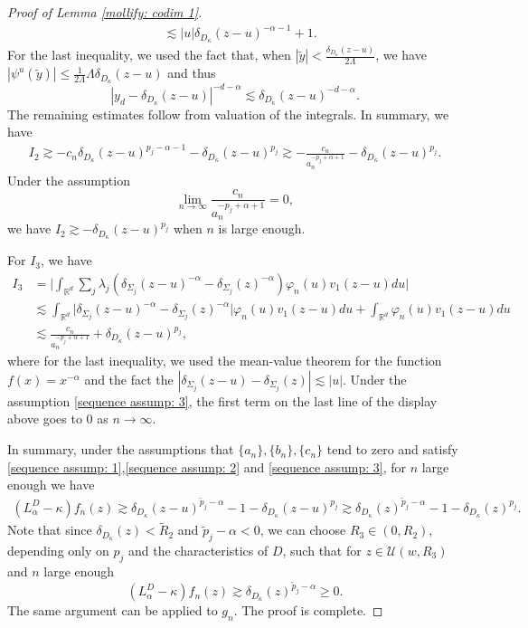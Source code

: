 \documentclass[12pt,a4paper]{amsart}
\numberwithin{equation}{section}
\theoremstyle{plain}
\newcommand{\Si}{\Sigma}
\newcommand{\mc}{\mathcal}
\newcommand{\mb}{\mathbb}
\newcommand{\wt}{\widetilde}
\newcommand{\1}{\mathbbm{1}}
\begin{document}
\begin{proof}[Proof of Lemma \ref{mollify: codim 1}]
\begin{align*}
& \lesssim |u|\delta_{D_{\kappa}}(z-u)^{-\alpha - 1} + 1.
\end{align*}
For the last inequality, we used the fact that, when $|\wt y|< \frac{\delta_{D_{\kappa}}(z-u)}{2\Lambda}$,  we have $|\psi^u(\wt y)| \le \frac{1}{2\Lambda} \Lambda \delta_{D_{\kappa}}(z-u)$ and thus
$$|y_d - \delta_{D_{\kappa}}(z-u)|^{-d-\alpha} \lesssim \delta_{D_{\kappa}}(z-u)^{-d-\alpha}.$$
The remaining estimates follow from valuation of the integrals. In summary, we have
\begin{align}\label{e:I2}
I_2 \gtrsim -c_n \delta_{D_{\kappa}}(z-u)^{p_j-\alpha - 1} - \delta_{D_{\kappa}}(z-u)^{p_j} \gtrsim -\frac{c_n}{a_n^{-p_j+\alpha + 1}}- \delta_{D_{\kappa}}(z-u)^{p_j}.
\end{align}
Under the assumption 
\begin{equation}\label{sequence assump: 3}
\lim_{n\to \infty} \frac{c_n}{a_n^{-p_j+\alpha + 1}} = 0,
\end{equation}
we have $I_2\gtrsim - \delta_{D_{\kappa}}(z-u)^{p_j}$ when $n$ is large enough.

For $I_3$, we have
\begin{align*}
I_3& = \bigg|\int_{\mb R^d}\sum_{j}\lambda_{j}(\delta_{\Si_{j}}(z-u)^{-\alpha} -\delta_{\Si_{j}}(z)^{-\alpha} ) \varphi_n(u)v_1(z-u)du \bigg| \\
& \lesssim \int_{\mb R^d} \big|\delta_{\Si_{j}}(z-u)^{-\alpha} -\delta_{\Si_{j}}(z)^{-\alpha} \big|\varphi_n(u)v_1(z-u)du + \int_{\mb R^d}\varphi_n(u)v_1(z-u)du \\
& \lesssim \frac{c_n}{a_n^{-p_j+\alpha +1}}+ \delta_{D_{\kappa}}(z-u)^{p_j} ,
\end{align*}
where for the last inequality, we used the mean-value theorem for the function $f(x) = x^{-\alpha}$ and the fact the $|\delta_{\Si_{j}}(z-u)-\delta_{\Si_{j}}(z)| \lesssim |u|$. 
Under the assumption \eqref{sequence assump: 3}, the first term on the last line of the display above goes to 0 as $n\to\infty$.

In summary, under the assumptions that $\{a_n\},\{b_n\},\{c_n\}$ tend to zero and satisfy \eqref{sequence assump: 1},\eqref{sequence assump: 2} and \eqref{sequence assump: 3}, for 
$n$ large enough we have 
\begin{align*}
(L^D_\alpha-\kappa)f_n(z)
\gtrsim \delta_{D_{\kappa}}(z-u)^{\wt p_j-\alpha} - 1 - \delta_{D_{\kappa}}(z-u)^{p_j} \gtrsim \delta_{D_{\kappa}}(z)^{\wt p_j-\alpha} - 1 - \delta_{D_{\kappa}}(z)^{p_j}.
\end{align*}
Note that since $\delta_{D_{\kappa}}(z)<\wt R_2$ and $\wt p_j-\alpha<0$, we can choose 
$R_3\in (0, R_2)$, depending only on $p_j$ and the characteristics of $D$, 
such that 
for $z\in \mc U(w, R_3)$ and $n$ large enough 
$$
(L^D_\alpha-\kappa)f_n(z)
\gtrsim \delta_{D_{\kappa}}(z)^{\wt p_j-\alpha} \ge 0.$$
The same argument can be applied to $g_n$.  The proof is complete.
\end{proof}
\end{document}
